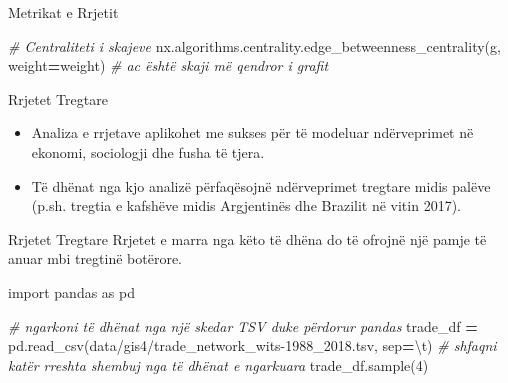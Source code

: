 \documentclass[
  ignorenonframetext,
]{beamer}
\newenvironment{Shaded}{\begin{snugshade}}{\end{snugshade}}
\newcommand{\CharTok}[1]{\textcolor[rgb]{0.31,0.60,0.02}{#1}}
\newcommand{\CommentTok}[1]{\textcolor[rgb]{0.56,0.35,0.01}{\textit{#1}}}
\newcommand{\DecValTok}[1]{\textcolor[rgb]{0.00,0.00,0.81}{#1}}
\newcommand{\ImportTok}[1]{#1}
\newcommand{\NormalTok}[1]{#1}
\newcommand{\OperatorTok}[1]{\textcolor[rgb]{0.81,0.36,0.00}{\textbf{#1}}}
\newcommand{\StringTok}[1]{\textcolor[rgb]{0.31,0.60,0.02}{#1}}
\begin{document}
\begin{frame}[fragile]{Metrikat e Rrjetit}
\protect\hypertarget{metrikat-e-rrjetit-8}{}

\begin{Shaded}
\begin{Highlighting}[]
\CommentTok{\# Centraliteti i skajeve}
\NormalTok{nx.algorithms.centrality.edge\_betweenness\_centrality(g, weight}\OperatorTok{=}\StringTok{\textquotesingle{}weight\textquotesingle{}}\NormalTok{)}
\CommentTok{\# \textquotesingle{}ac\textquotesingle{} është skaji më qendror i grafit}
\end{Highlighting}
\end{Shaded}
\end{frame}

\begin{frame}{Rrjetet Tregtare}
\protect\hypertarget{rrjetet-tregtare}{}
\begin{itemize}
\item
  Analiza e rrjetave aplikohet me sukses për të modeluar ndërveprimet në
  ekonomi, sociologji dhe fusha të tjera.
\item
  Të dhënat nga kjo analizë përfaqësojnë ndërveprimet tregtare midis
  palëve (p.sh. tregtia e kafshëve midis Argjentinës dhe Brazilit në
  vitin 2017).
\end{itemize}
\end{frame}

\begin{frame}[fragile]{Rrjetet Tregtare}
\protect\hypertarget{rrjetet-tregtare-1}{}
Rrjetet e marra nga këto të dhëna do të ofrojnë një pamje të anuar mbi
tregtinë botërore.


\begin{Shaded}
\begin{Highlighting}[]
\ImportTok{import}\NormalTok{ pandas }\ImportTok{as}\NormalTok{ pd}

\CommentTok{\# ngarkoni të dhënat nga një skedar TSV duke përdorur pandas}
\NormalTok{trade\_df }\OperatorTok{=}\NormalTok{ pd.read\_csv(}\StringTok{\textquotesingle{}data/gis4/trade\_network\_wits{-}1988\_2018.tsv\textquotesingle{}}\NormalTok{, sep}\OperatorTok{=}\StringTok{\textquotesingle{}}\CharTok{\textbackslash{}t}\StringTok{\textquotesingle{}}\NormalTok{)}
\CommentTok{\# shfaqni katër rreshta shembuj nga të dhënat e ngarkuara}
\NormalTok{trade\_df.sample(}\DecValTok{4}\NormalTok{)}
\end{Highlighting}
\end{Shaded}
\end{frame}
\end{document}
